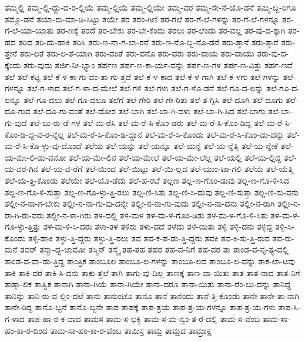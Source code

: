 {ತಮ್ಮಲ್ಲಿ
ತಮ್ಮ-ಲ್ಲಿ-ದ್ದು-ದ-ರ-ಲ್ಲಿಯೆ
ತಮ್ಮ-ಲ್ಲಿಯೆ
ತಮ್ಮ-ಲ್ಲಿಯೇ
ತಮ್ಮ-ವರ
ತಮ್ಮ-ಸೇ-ನೆ-ಯೊ-ಡನೆ
ತಮ್ಮಿ-ಬ್ಬ-ರಿಗೂ
ತಮ್ಮೊ-ಡನೆ
ತಯಾ-ರು-ಮಾ-ಡಿ-ಸಿಟ್ಟು
ತಯೇ
ತರ
ತರಂ-ಗಿಣಿ
ತರ-ಗಲೆ
ತರ-ಗೆ-ಲೆ-ಗಳನ್ನು
ತರ-ಗೆ-ಲೆ-ಗಳನ್ನೂ
ತರ-ಗೆ-ಲೆ-ಯಾ-ಯಾತು
ತರ-ಣಕ್ಕೆ
ತರದೆ
ತರ-ಬೇಕು
ತರ-ಬೇ-ಕೆಂದು
ತರಲು
ತರ-ಲೆಂದು
ತರ-ವಲ್ಲ
ತರ-ವು-ದ-ಕ್ಕಾಗಿ
ತರ-ಹದ
ತರಿದ
ತರಿ-ದು-ಹಾಕಿ
ತರಿಸಿ
ತರು-ಣ-ನಾ-ಗ-ಲಾ-ರನೆ
ತರು-ಣ-ನೊ-ಬ್ಬ-ನೊ-ಡನೆ
ತರು-ತ್ತಾನೆ
ತರು-ತ್ತಾರೆ
ತರು-ತ್ತೇನೆ
ತರು-ಲತೆ
ತರು-ಲ-ತೆ-ಯಾಗಿ
ತರು-ವಂತೆ
ತರು-ವನೊ
ತರು-ವರು
ತರು-ವಾಯ
ತರು-ವಾಯು
ತರು-ವು-ದ-ಕ್ಕೆಂದು
ತರು-ವುದು
ತರ್ಜಿ-ನೀ-ಭ್ಯಾಂ
ತರ್ಪಣ
ತರ್ಪ-ಣ-ಕಾ-ರ್ಯ-ವನ್ನು
ತರ್ಪ-ಣ-ಗಳ
ತರ್ಪ-ಣ-ವಿತ್ತು
ತರ್ಪ-ಣವೆ
ತಲೆ
ತಲೆ-ಕೆಟ್ಟ
ತಲೆ-ಕೆ-ಳ-ಕಾ-ಗು-ವಂ-ತಾ-ಗು-ತ್ತದೆ
ತಲೆ-ಕೆ-ಳ-ಕಾದ
ತಲೆ-ಕೆ-ಳ-ಗಾಗಿ
ತಲೆ-ಕೆ-ಳಗು
ತಲೆ-ಗಳನ್ನು
ತಲೆ-ಗಳನ್ನೂ
ತಲೆ-ಗ-ಳಾದ
ತಲೆ-ಗ-ಳಾ-ದ-ಮೇಲೆ
ತಲೆ-ಗಳಿ
ತಲೆ-ಗಳು
ತಲೆ-ಗ-ಳೊ-ಡನೆ
ತಲೆ-ಗೂ-ದ-ಲನ್ನು
ತಲೆ-ಗೂ-ದ-ಲನ್ನೂ
ತಲೆ-ಗೂ-ದಲು
ತಲೆ-ಗೂ-ದಲೂ
ತಲೆಗೆ
ತಲೆ-ಗೇರಿ
ತಲೆ-ಗೇ-ರಿತು
ತಲೆ-ತ-ಗ್ಗಿಸಿ
ತಲೆ-ದೂಗಿ
ತಲೆ-ದೂಗು
ತಲೆ-ದೂ-ಗುವ
ತಲೆ-ದೂ-ಗು-ವಂತೆ
ತಲೆ-ದೋರ
ತಲೆ-ಬಾಗಿ
ತಲೆ-ಬಾ-ಗಿ-ದಳು
ತಲೆ-ಬಾ-ಗಿ-ಸಿದ
ತಲೆ-ಬಾಗು
ತಲೆ-ಬಾ-ಗು-ವುದೆ
ತಲೆ-ಬು-ರು-ಡೆ-ಗಳ
ತಲೆ-ಮ-ರೆಸಿ
ತಲೆ-ಮ-ರೆ-ಸಿ-ಕೊಂ-ಡರು
ತಲೆ-ಮ-ರೆ-ಸಿ-ಕೊಂ-ಡಿದ್ದ
ತಲೆ-ಮ-ರೆ-ಸಿ-ಕೊಂ-ಡಿ-ದ್ದ-ವ-ರ-ನ್ನೆಲ್ಲ
ತಲೆ-ಮ-ರೆ-ಸಿ-ಕೊಂ-ಡಿ-ದ್ದಾನೆ
ತಲೆ-ಮ-ರೆ-ಸಿ-ಕೊಂಡು
ತಲೆ-ಮ-ರೆ-ಸಿ-ಕೊಂ-ಡು-ದನ್ನು
ತಲೆ-ಮ-ರೆ-ಸಿ-ಕೊ-ಳ್ಳು-ವು-ದೊಂದೆ
ತಲೆಯ
ತಲೆ-ಯನ್ನು
ತಲೆ-ಯನ್ನೂ
ತಲೆ-ಯನ್ನೆ
ತಲೆ-ಯ-ನ್ನೆತ್ತಿ
ತಲೆ-ಯ-ನ್ನೇಕೆ
ತಲೆ-ಯ-ಮೇ-ಲಿ-ಡು-ವನೋ
ತಲೆ-ಯ-ಮೇ-ಲಿನ
ತಲೆ-ಯ-ಮೇಲೆ
ತಲೆ-ಯ-ಮೇ-ಲೆಲ್ಲ
ತಲೆ-ಯಲ್ಲಿ
ತಲೆ-ಯ-ಲ್ಲಿದ್ದ
ತಲೆ-ಯ-ವರೆ-ಗಿನ
ತಲೆ-ಯ-ವ-ರೆಗೆ
ತಲೆ-ಯಿಂದ
ತಲೆ-ಯಿಟ್ಟು
ತಲೆ-ಯಿ-ಲ್ಲದ
ತಲೆ-ಯುಂ-ಟಾ-ಗಲಿ
ತಲೆಯೆ
ತಲೆ-ಯೆತ್ತಿ
ತಲೆ-ಯೆ-ತ್ತಿ-ಕೊಂಡು
ತಲೆಯೇ
ತಲೆ-ಯೊ-ಡೆದು
ತಲೆ-ಹ-ರಟೆ
ತಲ್ಲಣ
ತಲ್ಲ-ಣ-ಗೊಂ-ಡುವು
ತಲ್ಲ-ಣ-ಗೊ-ಳಿ-ಸಿದ
ತಲ್ಲ-ಣ-ಗೊ-ಳಿ-ಸುತ್ತಾ
ತಲ್ಲ-ಣ-ಗೊ-ಳ್ಳು-ತ್ತಿ-ರಲು
ತಲ್ಲ-ಣಿ-ಸಿತು
ತಲ್ಲ-ಣಿ-ಸಿ-ದುವು
ತಲ್ಲ-ಣಿ-ಸುತ್ತಾ
ತಲ್ಲ-ಣಿ-ಸು-ವನು
ತಲ್ಲೀ-ನ-ನಾ-ಗ-ಬೇಕು
ತಲ್ಲೀ-ನ-ನಾ-ಗು-ವು-ದನ್ನೇ
ತಲ್ಲೀ-ನ-ನಾ-ಗು-ವುದು
ತಲ್ಲೀ-ನ-ನಾ-ದನು
ತಲ್ಲೀ-ನ-ರಾಗಿ
ತಲ್ಲೀ-ನ-ರಾ-ಗಿ-ರು-ವರು
ತಲ್ಲೀ-ನ-ಳಾ-ಗಿರು
ತಳ-ದಲ್ಲಿ
ತಳ-ಮಳ
ತಳ-ಮ-ಳ-ಗೊಂ-ಡಿತು
ತಳ-ಮ-ಳ-ಗೊ-ಳಿ-ಸಿತು
ತಳ-ಮ-ಳ-ಗೊ-ಳ್ಳು-ತ್ತಿತ್ತು
ತಳ-ಮ-ಳಿ-ಸಿ-ದರು
ತಳಾ-ತಳ
ತಳಿರು
ತಳು-ವದೆ
ತಳೆದು
ತಳೆ-ಯಿತು
ತಳ್ಳಿ
ತಳ್ಳಿ-ದನು
ತಳ್ಳಿದ್ದ
ತಳ್ಳಿ-ಸಿ-ಕೊಂಡು
ತಳ್ಳಿ-ಹಾಕಿ
ತಳ್ಳು-ತ್ತಿ-ದ್ದರು
ತಳ್ಳು-ತ್ತಿ-ರಲು
ತವ
ತವ-ಕ-ಪ-ಡು-ತ್ತಿ-ದ್ದರು
ತವಕಿ
ತವ-ಕಿ-ಸು-ತ್ತಿ-ರುವ
ತವ-ರು-ಮನೆ
ತವರ್
ತಸ್ಮಾ-ದ್ಭ-ಜಾಮೋ
ತಸ್ಮಿನ್
ತಸ್ಮೈ
ತಹ-ತಹ
ತಹರ
ತಹ-ವ-ನಿಗೆ
ತಹ-ವರ
ತಾ
ತಾಂಡ-ವ-ನೃ-ತ್ಯ-ದಲ್ಲಿ
ತಾಂಡ-ವ-ವಾ-ಡು-ತ್ತಿದ್ದ
ತಾಂತ್ರಿಕ
ತಾಂಬೂಲ
ತಾಂಬೂ-ಲ-ಗಳನ್ನು
ತಾಂಬೂ-ಲದ
ತಾಂಬೂ-ಲ-ವನ್ನು
ತಾಕ-ಲಾ-ಟವು
ತಾಕಿ
ತಾಕಿ-ದರೆ
ತಾಕಿ-ಸಿ-ದನು
ತಾಕು-ತ್ತಲೆ
ತಾಗಿ
ತಾಗು-ವು-ದಿಲ್ಲ
ತಾಣಕ್ಕೆ
ತಾಣ-ವಾ-ಯಿತು
ತಾತ
ತಾತ-ನಾದ
ತಾತ-ನಿಗೆ
ತಾತ್ಕಾ-ಲಿಕ
ತಾತ್ವಿಕ
ತಾನಾಗಿ
ತಾನಾ-ಗಿಯೆ
ತಾನಾ-ಗಿಯೇ
ತಾನಾ-ದರೂ
ತಾನಾ-ಯಿತು
ತಾನಾ-ರೆಂ-ಬು-ದನ್ನು
ತಾನಿದ್ದ
ತಾನಿನ್ನು
ತಾನಿ-ರು-ವ-ಲ್ಲಿಂ-ದಲೆ
ತಾನು
ತಾನುಂಟೊ
ತಾನೂ
ತಾನೆ
ತಾನೆಂದು
ತಾನೆ-ತ್ತಿ-ಕೊಂಡು
ತಾನೇ
ತಾನೇ-ತಾ-ನಾಗಿ
ತಾನೇ-ರಿದ್ದ
ತಾನೊ-ಬ್ಬನೆ
ತಾನೊ-ಬ್ಬನೇ
ತಾಪ
ತಾಪಕ್ಕೆ
ತಾಪ-ತ್ರಯ
ತಾಪ-ತ್ರ-ಯ-ಗಳನ್ನೂ
ತಾಪ-ತ್ರ-ಯ-ಗಳು
ತಾಪ-ಸಿ-ಗ-ಳಾದ
ತಾಪ-ಹಾ-ರ-ಕ-ವಾದ
ತಾಮಸ
ತಾಮ-ಸ-ಭಕ್ತಿ
ತಾಮ-ಸ-ಮ-ನ್ವಂ-ತ-ರ-ದಲ್ಲಿ
ತಾಮ-ಸ-ವೆಂಬ
ತಾಮ-ಸಾ-ಹಂ-ಕಾ-ರ-ದಿಂದ
ತಾಮ-ಸಾ-ಹಂ-ಕಾ-ರ-ವೆಂಬ
ತಾಮಿಸ್ರ
ತಾಮ್ರ
ತಾಮ್ರದ
ತಾಮ್ರಾಕ್ಷ
}
